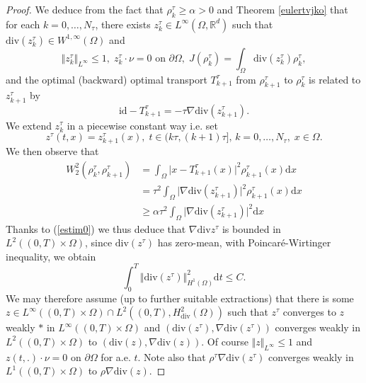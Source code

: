 \documentclass[12pt, a4paper]{article}
\numberwithin{equation}{section}
\theoremstyle{plain}
\theoremstyle{definition}
\theoremstyle{remark}
\newcommand{\R}{\mathbb{R}}
\newcommand{\id}{\mathrm{id}}
\newcommand{\dive}{\mathrm{div}}
\newcommand\pref[1]{(\ref{#1})}
\begin{document}
\begin{proof}
 We deduce from the fact that $\rho_k^\tau\ge \alpha>0$ and Theorem \ref{eulertvjko} that for each $k=0, \ldots, N_\tau$,  there exists $z_k^\tau  \in L^{\infty}(\Omega, \R^d)$ such that $\dive(z_k^\tau)  \in W^{1, \infty}(\Omega)$ and 
 \begin{equation}\label{eulerk1}
 \Vert z_k^\tau\Vert_{L^\infty} \le 1, \; z_k^\tau\cdot \nu=0 \mbox{ on $\partial \Omega$}, \; J(\rho_{k}^\tau)=\int_\Omega \dive (z_k^\tau) \rho_k^\tau, 
 \end{equation}
  and the optimal (backward) optimal transport $T_{k+1}^\tau$ from $\rho_{k+1}^\tau$ to $\rho_k^\tau$ is related to $z_{k+1}^\tau$ by
  \begin{equation}\label{eulerk2}
  \id-T_{k+1}^\tau=-\tau \nabla \dive ( z_{k+1}^\tau).
  \end{equation}
We extend $z_k^\tau$ in a piecewise constant way i.e. set
\begin{equation}\label{extendz}
z^\tau(t,x)=z_{k+1}^\tau(x), \; t\in (k\tau, (k+1)\tau], \, k=0, \ldots, N_\tau, \; x\in \Omega. 
\end{equation}
We then observe that 
\[\begin{split}
W_2^2(\rho_k^\tau, \rho_{k+1}^\tau) &=\int_\Omega \vert x-T_{k+1}^\tau(x)\vert^2 \rho_{k+1}^\tau(x) \mbox{d} x\\
&=\tau^2 \int_\Omega \vert \nabla \dive( z_{k+1}^\tau)\vert ^2 \rho_{k+1}^\tau(x) \mbox{d} x\\
 &\ge \alpha \tau^2 \int_\Omega \vert \nabla \dive( z_{k+1}^\tau)\vert ^2 \mbox{d} x
\end{split}\]
Thanks to \pref{estim0} we thus deduce that $\nabla \dive z^\tau$ is bounded in $L^2((0,T)\times \Omega)$, since $\dive(z^\tau)$ has zero-mean, with Poincar\'e-Wirtinger inequality, we obtain
\begin{equation}\label{h2bound}
 \int_0^T  \Vert \dive(z^\tau) \Vert^2_{H^1(\Omega)} \mbox{d}t \le C.
\end{equation}
We may therefore assume (up to further suitable extractions) that there is some $z\in L^{\infty}((0,T)\times \Omega)\cap L^2((0,T), H^2_{\dive}(\Omega))$ such that $z^\tau$ converges to $z$ weakly $*$ in $L^\infty((0,T)\times \Omega)$ and  $(\dive(z^\tau), \nabla \dive(z^\tau))$ converges  weakly in $L^2((0,T)\times \Omega)$ to $(\dive(z), \nabla \dive(z))$. Of course $\Vert z \Vert_{L^\infty} \le 1$ and $z(t,.) \cdot \nu=0$ on $\partial \Omega$ for a.e. $t$. Note also that $\rho^\tau \nabla \dive( z^\tau)$ converges weakly in $L^1((0,T)\times \Omega )$ to $\rho  \nabla \dive (z)$.


\end{proof}
\end{document}

